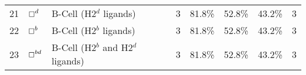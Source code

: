 \begin{tabular}{rllccccc}
21 &                                      $ \boxempty^d $ &                  B-Cell (H2$^d$ ligands) &            3 &         81.8\% &          52.8\% &         43.2\% &                          3 \\
22 &                                      $ \boxempty^b $ &                  B-Cell (H2$^b$ ligands) &            3 &         81.8\% &          52.8\% &         43.2\% &                          3 \\
23 &                                   $ \boxempty^{bd} $ &       B-Cell (H2$^b$ and H2$^d$ ligands) &            3 &         81.8\% &          52.8\% &         43.2\% &                          3 \\
\bottomrule
\end{tabular}
